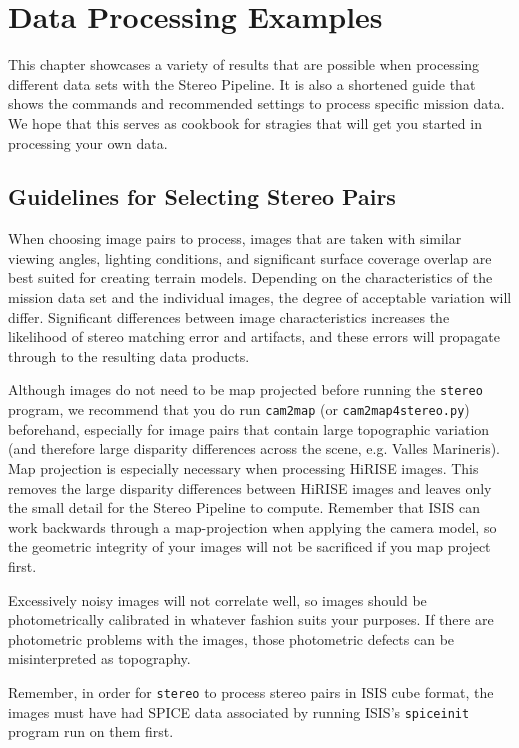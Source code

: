 \chapter{Data Processing Examples}
\label{ch:examples}


This chapter showcases a variety of results that are possible when
processing different data sets with the Stereo Pipeline. It is also a
shortened guide that shows the commands and recommended settings to
process specific mission data. We hope that this serves as cookbook
for stragies that will get you started in processing your own data.

\section{Guidelines for Selecting Stereo Pairs}

When choosing image pairs to process, images that are taken with
similar viewing angles, lighting conditions, and significant surface
coverage overlap are best suited for creating terrain
models. Depending on the characteristics of the mission data set and
the individual images, the degree of acceptable variation will
differ. Significant differences between image characteristics
increases the likelihood of stereo matching error and artifacts, and
these errors will propagate through to the resulting data products.

Although images do not need to be map projected before running the
\texttt{stereo} program, we recommend that you do run {\tt cam2map}
(or \texttt{cam2map4stereo.py})
beforehand, especially for image pairs that contain large topographic
variation (and therefore large disparity differences across the
scene, e.g. Valles Marineris).  Map projection is especially necessary
when processing \ac{HiRISE} images. This removes the large disparity
differences between \ac{HiRISE} images and leaves only the small
detail for the Stereo Pipeline to compute. Remember that \ac{ISIS}
can work backwards through a map-projection when applying the camera
model, so the geometric integrity of your images will not be sacrificed
if you map project first.

Excessively noisy images will not correlate well, so images should be
photometrically calibrated in whatever fashion suits your purposes. If
there are photometric problems with the images, those photometric
defects can be misinterpreted as topography.

Remember, in order for \texttt{stereo} to process stereo pairs in
\ac{ISIS} cube format, the images must have had SPICE data associated
by running ISIS's \texttt{spiceinit} program run on them first.

